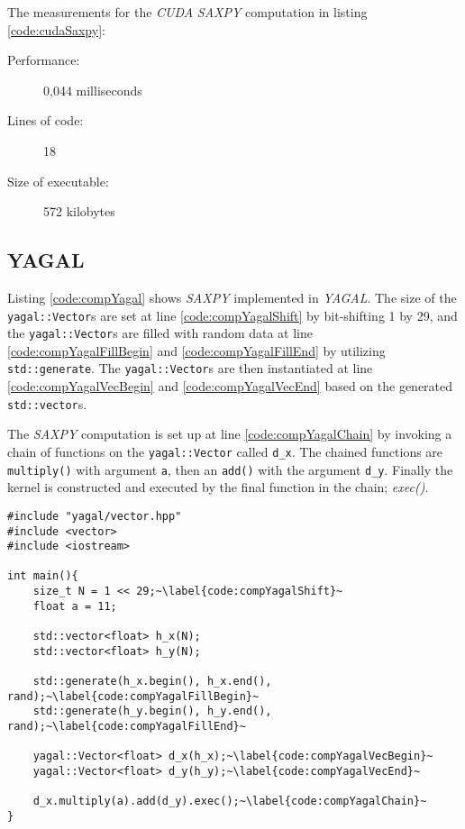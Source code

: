 The measurements for the \textit{CUDA} \textit{SAXPY} computation in listing \ref{code:cudaSaxpy}:
\begin{description}
    \item[Performance:] 0,044 milliseconds
    \item[Lines of code:] 18
    \item[Size of executable:] 572 kilobytes
\end{description}

\subsection{YAGAL}
Listing \ref{code:compYagal} shows \textit{SAXPY} implemented in \textit{YAGAL}. The size of the \texttt{yagal::Vector}s are set at line \ref{code:compYagalShift} by bit-shifting 1 by 29, and the \texttt{yagal::Vector}s are filled with random data at line \ref{code:compYagalFillBegin} and \ref{code:compYagalFillEnd} by utilizing \texttt{std::generate}. The \texttt{yagal::Vector}s are then instantiated at line \ref{code:compYagalVecBegin} and \ref{code:compYagalVecEnd} based on the generated \texttt{std::vector}s.

The \textit{SAXPY} computation is set up at line \ref{code:compYagalChain} by invoking a chain of functions on the \texttt{yagal::Vector} called \texttt{d\_x}. The chained functions are \texttt{multiply()} with argument \texttt{a}, then an \texttt{add()} with the argument \texttt{d\_y}. Finally the kernel is constructed and executed by the final function in the chain; \textit{exec()}.

\begin{lstlisting}[caption={\textit{YAGAL} \textit{SAXPY}.}, label={code:compYagal}]
#include "yagal/vector.hpp"
#include <vector>
#include <iostream>

int main(){
    size_t N = 1 << 29;~\label{code:compYagalShift}~
    float a = 11;

    std::vector<float> h_x(N);
    std::vector<float> h_y(N);

    std::generate(h_x.begin(), h_x.end(), rand);~\label{code:compYagalFillBegin}~
    std::generate(h_y.begin(), h_y.end(), rand);~\label{code:compYagalFillEnd}~

    yagal::Vector<float> d_x(h_x);~\label{code:compYagalVecBegin}~
    yagal::Vector<float> d_y(h_y);~\label{code:compYagalVecEnd}~
    
    d_x.multiply(a).add(d_y).exec();~\label{code:compYagalChain}~
}
\end{lstlisting}

